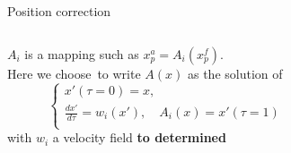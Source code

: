 \documentclass[aspectratio=169]{beamer} %
\begin{document}
\begin{frame}{Position correction}
    \begin{columns}[t]
        \begin{column}{0.6\textwidth}
            $A_i$ is a mapping such as $x^a_{p} = A_i(x^f_{p})$. \\
            Here we choose~\footnotemark[1] to write $A(x)$ as the solution of\\
            \begin{equation*}
                \begin{cases}
                    x'(\tau = 0) = x,                                           \\
                    \frac{d x'}{d \tau} = w_i (x'), \quad A_i(x) = x'(\tau = 1) \\
                \end{cases}
            \end{equation*}with $w_i$ a velocity field \textbf{to determined}
        \end{column}
        \begin{column}{0.4\textwidth}
            \vspace{-2cm}
            \begin{figure}
                \centering

\end{figure}
\end{column}
\end{columns}
\end{frame}
\end{document}

